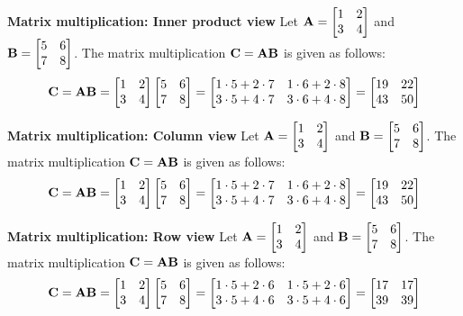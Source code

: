 \begin{boxedstuff}
    \begin{example}
        \textbf{Matrix multiplication: Inner product view} Let $\mf{A} = \bmx 1 & 2 \\ 3 & 4 \emx$ and $\mf{B} = \bmx 5 & 6 \\ 7 & 8 \emx$. The matrix multiplication $\mathbf{C} = \mathbf{A}\mathbf{B}$ is given as follows:
        \[ \mf{C} = \mf{A}\mf{B} = \bmxc 1 & 2 \\ 3 & 4 \emx \bmxc 5 & 6 \\ 7 & 8 \emx = \bmxc 1 \cdot 5 + 2 \cdot 7 & 1 \cdot 6 + 2 \cdot 8 \\ 3 \cdot 5 + 4 \cdot 7 & 3 \cdot 6 + 4 \cdot 8 \emx = \bmxc 19 & 22 \\ 43 & 50 \emx \]
        \label{example:ch02-mat-mult-inner-prod}
    \end{example}

    \begin{example}
        \textbf{Matrix multiplication: Column view} Let $\mf{A} = \bmx 1 & 2 \\ 3 & 4 \emx$ and $\mf{B} = \bmx 5 & 6 \\ 7 & 8 \emx$. The matrix multiplication $\mathbf{C} = \mathbf{A}\mathbf{B}$ is given as follows:
        \[ \mf{C} = \mf{A}\mf{B} = \bmxc 1 & 2 \\ 3 & 4 \emx \bmx 5 & 6 \\ 7 & 8 \emx = \bmx 1 \cdot 5 + 2 \cdot 7 & 1 \cdot 6 + 2 \cdot 8 \\ 3 \cdot 5 + 4 \cdot 7 & 3 \cdot 6 + 4 \cdot 8 \emx = \bmx 19 & 22 \\ 43 & 50 \emx \]
        \label{example:ch02-mat-mult-col-view}
    \end{example}

    \begin{example}
        \textbf{Matrix multiplication: Row view} Let $\mf{A} = \bmx 1 & 2 \\ 3 & 4 \emx$ and $\mf{B} = \bmx 5 & 6 \\ 7 & 8 \emx$. The matrix multiplication $\mathbf{C} = \mathbf{A}\mathbf{B}$ is given as follows:
        \[ \mf{C} = \mf{A}\mf{B} = \bmxc 1 & 2 \\ 3 & 4 \emx \bmx 5 & 6 \\ 7 & 8 \emx = \bmxc 1 \cdot 5 + 2 \cdot 6 & 1 \cdot 5 + 2 \cdot 6 \\ 3 \cdot 5 + 4 \cdot 6 & 3 \cdot 5 + 4 \cdot 6 \emx = \bmxc 17 & 17 \\ 39 & 39 \emx \]
        \label{example:ch02-mat-mult-row-view}
    \end{example}


\end{boxedstuff}

